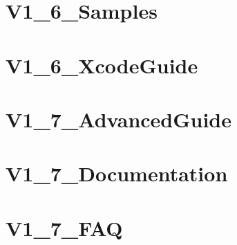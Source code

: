 \documentclass[twoside]{book}
\newcommand{\+}{\discretionary{\mbox{\scriptsize$\hookleftarrow$}}{}{}}
\begin{document}
\chapter{V1\+\_\+6\+\_\+\+Samples}
\label{md___users_fjp_git_bachelor_bachelor-master_updated_vfinal_googletest-1_88_80_googletest_docs__v1_6__samples}

\chapter{V1\+\_\+6\+\_\+\+Xcode\+Guide}
\label{md___users_fjp_git_bachelor_bachelor-master_updated_vfinal_googletest-1_88_80_googletest_docs__v1_6__xcode_guide}

\chapter{V1\+\_\+7\+\_\+\+Advanced\+Guide}
\label{md___users_fjp_git_bachelor_bachelor-master_updated_vfinal_googletest-1_88_80_googletest_docs__v1_7__advanced_guide}

\chapter{V1\+\_\+7\+\_\+\+Documentation}
\label{md___users_fjp_git_bachelor_bachelor-master_updated_vfinal_googletest-1_88_80_googletest_docs__v1_7__documentation}

\chapter{V1\+\_\+7\+\_\+\+F\+AQ}
\label{md___users_fjp_git_bachelor_bachelor-master_updated_vfinal_googletest-1_88_80_googletest_docs__v1_7__f_a_q}

\end{document}
